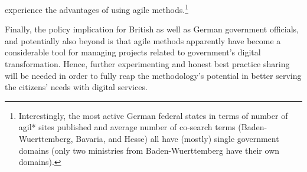 experience the advantages of using agile methods.\footnote{Interestingly, the most active German federal states in terms of number of agil* sites published and average number of co-search terms (Baden-Wuerttemberg, Bavaria, and Hesse) all have (mostly) single government domains (only two ministries from Baden-Wuerttemberg have their own domains).}

Finally, the policy implication for British as well as German government officials, and potentially also beyond is that agile methods apparently have become a considerable tool for managing projects related to government's digital transformation. Hence, further experimenting and honest best practice sharing will be needed in order to fully reap the methodology's potential in better serving the citizens' needs with digital services. 

